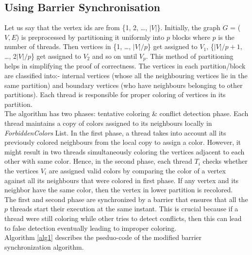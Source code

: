 \documentclass[a4paper,11pt]{article}
\begin{document}
\subsection{Using Barrier Synchronisation}
\indent Let us say that the vertex ids are from \{1, 2, \dots, $\mid$$V$$\mid$\}. Initially, the graph $G$ = ($V,E$) is preprocessed by partitioning it uniformly into $p$ blocks where $p$ is the number of threads. Then vertices in \{1, \dots, $|V| / p$\} get assigned to $V_1$, \{$|V| / p+1$, \dots, 2$|V| / p$\} get assigned to $V_2$ and so on until $V_p$. This method of partitioning helps in simplifying the proof of correctness. The vertices in each partition/block are classified into:- internal vertices (whose all the neighbouring vertices lie in the same partition) and boundary vertices (who have  neighbours belonging to other partitions). Each thread is responsible for proper coloring of vertices in its partition. \\
\indent The algorithm has two phases: tentative coloring \& conflict detection phase. Each thread maintains a copy of colors assigned to its neighbours locally in \textit{ForbiddenColors} List. In the first phase, a thread takes into account all its previously colored neighbours from the local copy to assign a color. However, it might result in two threads simultaneously coloring the vertices adjacent to each other with same color. Hence, in the second phase, each thread $T_i$ checks whether the vertices $V_i$ are assigned valid colors by comparing the color of a vertex against all its neighbours that were colored in first phase. If any vertex and its neighbor have the same color, then the vertex in lower partition is recolored.\\
\indent The first and second phase are synchronized by a barrier that ensures that all the $p$ threads start their execution at the same instant. This is crucial because if a thread were still coloring while other tries to detect conflicts, then this can lead to false detection eventually leading to improper coloring.\\
\newline
Algorithm \ref{alg1} describes the pseduo-code of the modified barrier synchronization algorithm.\\
\end{document}
